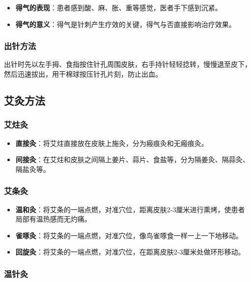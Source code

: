 \documentclass[12pt,UTF8]{ctexbook}
\begin{document}
\begin{itemize}
\item \textbf{得气的表现}：患者感到酸、麻、胀、重等感觉，医者手下感到沉紧。
\item \textbf{得气的意义}：得气是针刺产生疗效的关键，得气与否直接影响治疗效果。
\end{itemize}

\subsubsection{出针方法}

出针时先以左手拇、食指按住针孔周围皮肤，右手持针轻轻捻转，慢慢退至皮下，然后迅速拔出，用干棉球按压针孔片刻，防止出血。

\subsection{艾灸方法}

\subsubsection{艾炷灸}

\begin{itemize}
\item \textbf{直接灸}：将艾炷直接放在皮肤上施灸，分为瘢痕灸和无瘢痕灸。
\item \textbf{间接灸}：在艾炷和皮肤之间隔上姜片、蒜片、食盐等，分为隔姜灸、隔蒜灸、隔盐灸等。
\end{itemize}

\subsubsection{艾条灸}

\begin{itemize}
\item \textbf{温和灸}：将艾条的一端点燃，对准穴位，距离皮肤2-3厘米进行熏烤，使患者局部有温热感而无灼痛。
\item \textbf{雀啄灸}：将艾条的一端点燃，对准穴位，像鸟雀啄食一样一上一下地移动。
\item \textbf{回旋灸}：将艾条的一端点燃，对准穴位，在距离皮肤2-3厘米处做环形移动。
\end{itemize}

\subsubsection{温针灸}
\end{document}
